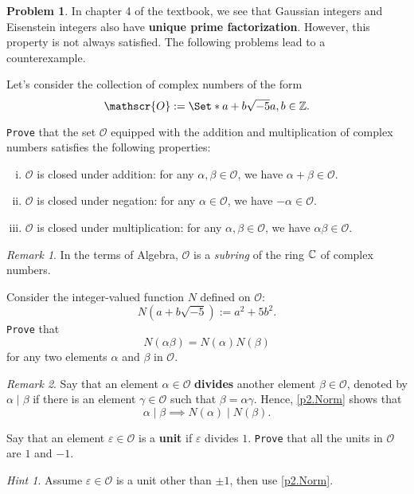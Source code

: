 \documentclass[11pt]{article}
\theoremstyle{plain}
\theoremstyle{definition}
\newtheorem{problem}{Problem}
\theoremstyle{remark}
\newtheorem*{remark}{Remark}
\newtheorem*{hint}{Hint}
\numberwithin{equation}{problem}
\providecommand\given{}
\begin{document}
\begin{problem}
	In chapter 4 of the textbook, we see that Gaussian integers and Eisenstein integers also have \textbf{unique prime factorization}. 
	However, this property is not always satisfied.
	The following problems lead to a counterexample. 

	Let's consider the collection of complex numbers of the form
	\[
		\mathscr{O} := \Set*{	a+b\sqrt{-5}	\given	a,b\in\Z	}.
	\]
	\begin{listinprob}
		\item \texttt{Prove} that the set $\mathscr{O}$ equipped with the addition and multiplication of complex numbers satisfies the following properties:
		\begin{enumerate}[(i)]
			\item $\mathscr{O}$ is closed under addition: for any $\alpha,\beta\in\mathscr{O}$, we have $\alpha+\beta\in\mathscr{O}$.
			\item $\mathscr{O}$ is closed under negation: for any $\alpha\in\mathscr{O}$, we have $-\alpha\in\mathscr{O}$.
			\item $\mathscr{O}$ is closed under multiplication: for any $\alpha,\beta\in\mathscr{O}$, we have $\alpha\beta\in\mathscr{O}$.
		\end{enumerate}
		\begin{remark}
			In the terms of Algebra, $\mathscr{O}$ is a \emph{subring} of the ring $\mathbb{C}$ of complex numbers.
		\end{remark}
		\item\label{p2.Norm} Consider the integer-valued function $N$ defined on $\mathscr{O}$: 
		\[
			N(a+b\sqrt{-5}) := a^2+5b^2.
		\]
		\texttt{Prove} that 
		\[
			N(\alpha\beta) = N(\alpha)N(\beta)
		\]
		for any two elements $\alpha$ and $\beta$ in $\mathscr{O}$.
		\begin{remark}
			Say that an element $\alpha\in\mathscr{O}$ \textbf{divides} another element $\beta\in\mathscr{O}$, denoted by $\alpha\mid\beta$ if there is an element $\gamma\in\mathscr{O}$ such that $\beta=\alpha\gamma$. Hence, \cref{p2.Norm} shows that 
			\[
				\alpha \mid \beta \implies N(\alpha) \mid N(\beta).
			\]
		\end{remark}
		\item\label{p2.unit} Say that an element $\varepsilon\in\mathscr{O}$ is a \textbf{unit} if $\varepsilon$ divides $1$. 
		\texttt{Prove} that all the units in $\mathscr{O}$ are $1$ and $-1$.
		\begin{hint}
			Assume $\varepsilon\in\mathscr{O}$ is a unit other than $\pm 1$, then use \cref{p2.Norm}.

\end{hint}
\end{listinprob}
\end{problem}
\end{document}
